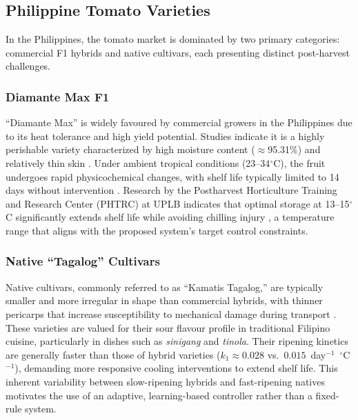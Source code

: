     \subsection{Philippine Tomato Varieties}

    In the Philippines, the tomato market is dominated by two primary categories: commercial F1 hybrids and native cultivars, each presenting distinct post-harvest challenges.

    \subsubsection{Diamante Max F1}

    ``Diamante Max'' is widely favoured by commercial growers in the Philippines due to its heat tolerance and high yield potential. Studies indicate it is a highly perishable variety characterized by high moisture content ($\approx$95.31\%) and relatively thin skin \citep{diamante_properties}. Under ambient tropical conditions (23--34$^{\circ}$C), the fruit undergoes rapid physicochemical changes, with shelf life typically limited to 14 days without intervention \citep{diamante_storage}. Research by the Postharvest Horticulture Training and Research Center (PHTRC) at UPLB indicates that optimal storage at 13--15$^{\circ}$C significantly extends shelf life while avoiding chilling injury \citep{uplb_phtrc}, a temperature range that aligns with the proposed system's target control constraints.

    \subsubsection{Native ``Tagalog'' Cultivars}

    Native cultivars, commonly referred to as ``Kamatis Tagalog,'' are typically smaller and more irregular in shape than commercial hybrids, with thinner pericarps that increase susceptibility to mechanical damage during transport \citep{native_tomato}. These varieties are valued for their sour flavour profile in traditional Filipino cuisine, particularly in dishes such as \textit{sinigang} and \textit{tinola}. Their ripening kinetics are generally faster than those of hybrid varieties ($k_1 \approx 0.028$ vs.\ $0.015$~day$^{-1}$~$^{\circ}$C$^{-1}$), demanding more responsive cooling interventions to extend shelf life. This inherent variability between slow-ripening hybrids and fast-ripening natives motivates the use of an adaptive, learning-based controller rather than a fixed-rule system.


